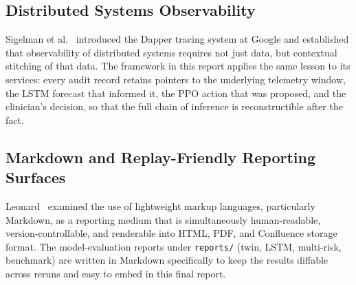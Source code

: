 \documentclass[12pt,a4paper,oneside]{report}
\begin{document}
\subsection{Distributed Systems Observability}
Sigelman et al.~\cite{sigelman2010} introduced the Dapper tracing system at Google and established that observability of distributed systems requires not just data, but contextual stitching of that data. The framework in this report applies the same lesson to its services: every audit record retains pointers to the underlying telemetry window, the LSTM forecast that informed it, the PPO action that was proposed, and the clinician's decision, so that the full chain of inference is reconstructible after the fact.

\subsection{Markdown and Replay-Friendly Reporting Surfaces}
Leonard~\cite{leonard2016} examined the use of lightweight markup languages, particularly Markdown, as a reporting medium that is simultaneously human-readable, version-controllable, and renderable into HTML, PDF, and Confluence storage format. The model-evaluation reports under \texttt{reports/} (twin, LSTM, multi-risk, benchmark) are written in Markdown specifically to keep the results diffable across reruns and easy to embed in this final report.
\end{document}
